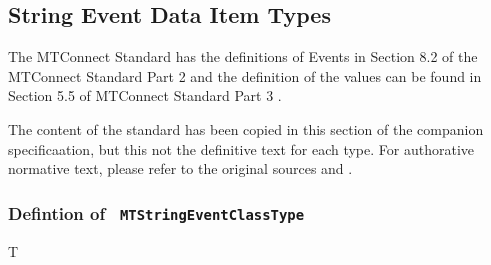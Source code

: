 \FloatBarrier
\subsection{String Event Data Item Types} \label{model:StringEventDataItemTypes}

The MTConnect Standard has the definitions of Events in 
Section 8.2 of the MTConnect Standard Part 2 \cite{MTCPart2} and the 
definition of the values can be found in Section 5.5 of MTConnect Standard Part 3 \cite{MTCPart3}. 

The content of the standard has been copied in this section of the companion specificaation,
but this not the definitive text for each type. For authorative normative text, please refer 
to the original sources \cite{MTCPart2} and \cite{MTCPart3}.

\subsubsection{Defintion of \texttt{ MTStringEventClassType}}
  \label{type:MTStringEventClassType}

\FloatBarrier

T

